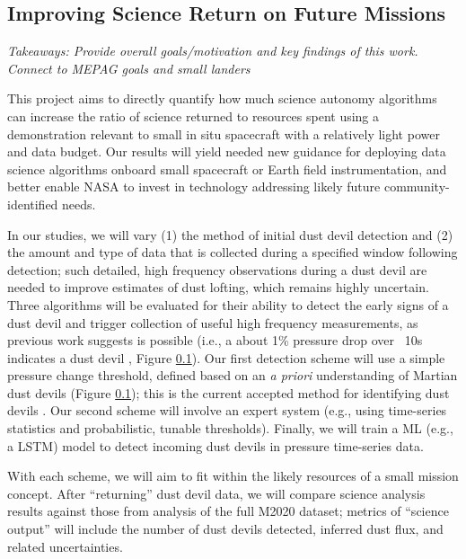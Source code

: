 \subsection{Improving Science Return on Future Missions}
\textit{Takeaways: Provide overall goals/motivation and key findings of this work. Connect to MEPAG goals and small landers}

This project aims to directly quantify how much science autonomy algorithms can increase the ratio of science returned to resources spent using a demonstration relevant to small in situ spacecraft with a relatively light power and data budget. Our results will yield needed new guidance for deploying data science algorithms onboard small spacecraft or Earth field instrumentation, and better enable NASA to invest in technology addressing likely future community-identified needs.

In our studies, we will vary (1) the method of initial dust devil detection and (2) the amount and type of data that is collected during a specified window following detection; such detailed, high frequency observations during a dust devil are needed to improve estimates of dust lofting, which remains highly uncertain.
Three algorithms will be evaluated for their ability to detect the early signs of a dust devil and trigger collection of useful high frequency measurements, as previous work suggests is possible (i.e., a about 1\% pressure drop over ~10s indicates a dust devil \cite{8inabstract}, Figure \ref{}). Our first detection scheme will use a simple pressure change threshold, defined based on an \textit{a priori} understanding of Martian dust devils (Figure \ref{}); this is the current accepted method for identifying dust devils \cite{8inabstract}. Our second scheme will involve an expert system (e.g., using time-series statistics and probabilistic, tunable thresholds). Finally, we will train a \acrlong{ML} (e.g., a \acrfull{LSTM}) model to detect incoming dust devils in pressure time-series data.  

With each scheme, we will aim to fit within the likely resources of a small mission concept. After “returning” dust devil data, we will compare science analysis results against those from analysis of the full M2020 dataset; metrics of “science output” will include the number of dust devils detected, inferred dust flux, and related uncertainties.